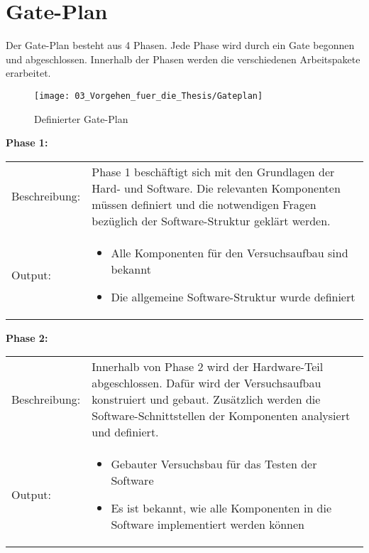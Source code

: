 \section{Gate-Plan} \label{Gate-Plan}

	Der Gate-Plan besteht aus 4 Phasen. Jede Phase wird durch ein Gate begonnen und abgeschlossen. Innerhalb der Phasen werden die verschiedenen Arbeitspakete erarbeitet. 

	\begin{figure}[h!]
		\centering
		\texttt{[image: 03\_Vorgehen\_fuer\_die\_Thesis/Gateplan]}
		\captionsetup{justification=centering}
		\caption{Definierter Gate-Plan}
		\label{fig:Gateplan}
	\end{figure}
	
	\textbf{Phase 1:} \vspace{2mm} 
	\\
		\begin{tabularx}{\textwidth}{@{}>{}p{7em} X@{}}
			Beschreibung: & 
			Phase 1 beschäftigt sich mit den Grundlagen der Hard- und Software. Die relevanten Komponenten müssen definiert und die notwendigen Fragen bezüglich der Software-Struktur geklärt werden.
			\\
			
			Output: & 
			\begin{itemize}
				\item Alle Komponenten für den Versuchsaufbau sind bekannt
				\item Die allgemeine Software-Struktur wurde definiert
			\end{itemize}
		\end{tabularx}
	
	\textbf{Phase 2:} \vspace{2mm} 
	\\
		\begin{tabularx}{\textwidth}{@{}>{}p{7em} X@{}}
			Beschreibung: & 
			Innerhalb von Phase 2 wird der Hardware-Teil abgeschlossen. Dafür wird der Versuchsaufbau konstruiert und gebaut. Zusätzlich werden die Software-Schnittstellen der Komponenten analysiert und definiert. 
			\\
			
			Output: & 
			\begin{itemize}
				\item Gebauter Versuchsbau für das Testen der Software
				\item Es ist bekannt, wie alle Komponenten in die Software implementiert werden können
			\end{itemize}
		\end{tabularx}
	
